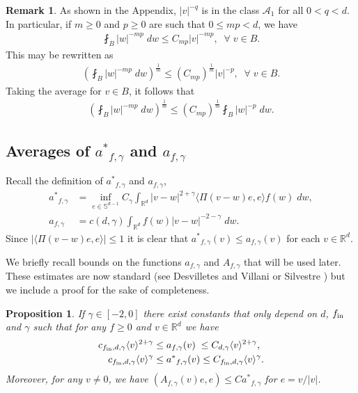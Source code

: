 \documentclass[12pt,american]{amsart}
\numberwithin{equation}{section}
\theoremstyle{plain}
\newtheorem{prop}[thm]{Proposition}
\theoremstyle{definition}                  %
\newtheorem{rem}[thm]{Remark}
\def\astar{{a^*}}
\def\fin{f_{\textnormal{in}}}
\begin{document}
  \begin{rem}\label{rem:reverse Holder for inverse powers of v}
    As shown in the Appendix, $|v|^{-q}$ is in the class $\mathcal{A}_1$ for all $0<q<d$. In particular, if $m\ge 0$ and $p \ge 0$ are such that $0\le mp<d$, we have
    \begin{align*}
      \fint_{B}|w|^{-mp}\;dw \leq C_{mp}|v|^{-mp},\;\;\forall\;v\in B.		
    \end{align*}			
    This may be rewritten as
    \begin{align*}
      \left ( \fint_{B}|w|^{-mp}\;dw \right )^{\frac{1}{m}}\leq (C_{mp})^{\frac{1}{m}}|v|^{-p},\;\;\forall\;v\in B.		
    \end{align*}			
    Taking the average for $v\in B$, it follows that	
    \begin{align*}
      \left (\fint_{B}|w|^{-mp}\;dw \right )^{\frac{1}{m}}\leq (C_{mp})^{\frac{1}{m}}\fint_{B}|w|^{-p}\;dw.		
    \end{align*}			
  \end{rem}
 

\subsection{Averages of $\astar_{f,\gamma}$ and $a_{f,\gamma}$}
  Recall the definition of $\astar_{f,\gamma}$ and $a_{f,\gamma}$, 
  \begin{align*}
    \astar_{f,\gamma} &= \inf \limits_{e\in\mathbb{S}^{d-1}} C_\gamma \int_{\mathbb{R}^d} |v-w|^{2+\gamma}\langle \Pi(v-w)e,e\rangle f(w)\;dw,\\
    a_{f,\gamma} &= c(d,\gamma)\int_{\mathbb{R}^d}f(w)|v-w|^{-2-\gamma}\;dw.
  \end{align*}
  Since $|\langle \Pi(v-w)e,e\rangle|\leq 1$ it is clear that $\astar_{f,\gamma} (v)\le a_{f,\gamma}(v)$ for each $v\in \mathbb{R}^d$. 
  
  We briefly recall bounds on the functions $a_{f,\gamma}$ and $A_{f,\gamma}$ that will be used later. These estimates are now standard (see Desvilletes and Villani \cite{DesVil2000a} or Silvestre \cite[Lemma 3.2]{Silvestre2015}) but we include a proof for the sake of completeness. 
  
\begin{prop}\label{prop:a vs a star gamma larger than -2}
  If $\gamma \in [-2,0]$ there exist constants that only depend on $d$, $\fin$ and $\gamma$ such that for any $f\geq 0$ and $v\in\mathbb{R}^d$ we have
  \begin{align*}
    c_{\fin,d,\gamma}\langle v\rangle^{2+\gamma} & \leq a_{f,\gamma}(v) \;\leq C_{d,\gamma}\langle v\rangle^{2+\gamma},\\ 
    c_{\fin,d,\gamma}\langle v\rangle^\gamma & \leq \astar_{f,\gamma}(v) \leq C_{\fin,d,\gamma}\langle v\rangle^\gamma.
  \end{align*}
  Moreover, for any $v\neq 0$, we have $(A_{f,\gamma}(v)e,e) \leq C\astar_{f,\gamma}$ for $e=v/|v|$.
\end{prop}
\end{document}
